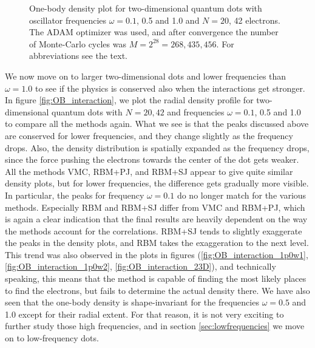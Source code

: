 \begin{figure}
	\caption{One-body density plot for two-dimensional quantum dots with oscillator frequencies $\omega=0.1$, 0.5 and 1.0 and $N=20$, 42 electrons. The ADAM optimizer was used, and after convergence the number of Monte-Carlo cycles was $M=2^{28}=268,435,456$. For abbreviations see the text.}
	\label{fig:OB_interaction}
\end{figure}

We now move on to larger two-dimensional dots and lower frequencies than $\omega=1.0$ to see if the physics is conserved also when the interactions get stronger. In figure \eqref{fig:OB_interaction}, we plot the radial density profile for two-dimensional quantum dots with $N=20,42$ and frequencies $\omega=0.1$, 0.5 and 1.0 to compare all the methods again. What we see is that the peaks discussed above are conserved for lower frequencies, and they change slightly as the frequency drops. Also, the density distribution is spatially expanded as the frequency drops, since the force pushing the electrons towards the center of the dot gets weaker. All the methods VMC, RBM+PJ, and RBM+SJ appear to give quite similar density plots, but for lower frequencies, the difference gets gradually more visible. In particular, the peaks for frequency $\omega=0.1$ do no longer match for the various methods. Especially RBM and RBM+SJ differ from VMC and RBM+PJ, which is again a clear indication that the final results are heavily dependent on the way the methods account for the correlations. RBM+SJ tends to slightly exaggerate the peaks in the density plots, and RBM takes the exaggeration to the next level. This trend was also observed in the plots in figures (\ref{fig:OB_interaction_1p0w1}, \ref{fig:OB_interaction_1p0w2}, \ref{fig:OB_interaction_23D}), and technically speaking, this means that the method is capable of finding the most likely places to find the electrons, but fails to determine the actual density there. We have also seen that the one-body density is shape-invariant for the frequencies $\omega=0.5$ and 1.0 except for their radial extent. For that reason, it is not very exciting to further study those high frequencies, and in section \ref{sec:lowfrequencies} we move on to low-frequency dots.

